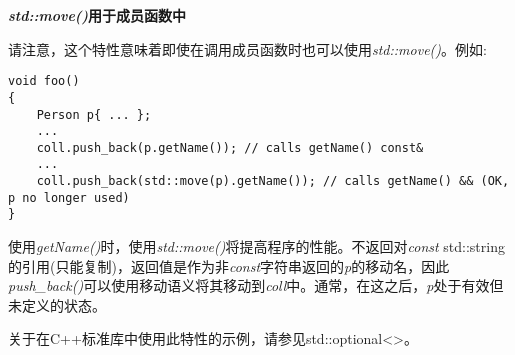 \hspace*{\fill} \par %
\textbf{\textit{std::move()}用于成员函数中}

请注意，这个特性意味着即使在调用成员函数时也可以使用\textit{std::move()}。例如:\par

\begin{lstlisting}[caption={}]
void foo()
{
	Person p{ ... };
	...
	coll.push_back(p.getName()); // calls getName() const&
	...
	coll.push_back(std::move(p).getName()); // calls getName() && (OK, p no longer used)
}
\end{lstlisting}

使用\textit{getName()}时，使用\textit{std::move()}将提高程序的性能。不返回对\textit{const} std::string的引用(只能复制)，返回值是作为非\textit{const}字符串返回的\textit{p}的移动名，因此\textit{push\_back()}可以使用移动语义将其移动到\textit{coll}中。通常，在这之后，\textit{p}处于有效但未定义的状态。\par

关于在C++标准库中使用此特性的示例，请参见std::optional<>。\par
















